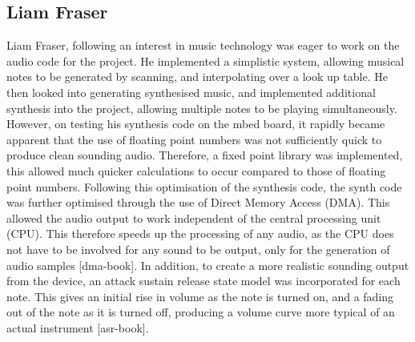 \subsection*{Liam Fraser}
Liam Fraser, following an interest in music technology was eager to work on the 
audio code for the project. He implemented a simplistic system, allowing musical 
notes to be generated by scanning, and interpolating over a look up table. He then 
looked into generating synthesised music, and implemented additional synthesis 
into the project, allowing multiple notes to be playing simultaneously. However, 
on testing his synthesis code on the mbed board, it rapidly became apparent that 
the use of floating point numbers was not sufficiently quick to produce clean 
sounding audio. Therefore, a fixed point library was implemented, this allowed 
much quicker calculations to occur compared to those of floating point numbers. 
Following this optimisation of the synthesis code, the synth code was further 
optimised through the use of Direct Memory Access (DMA). This allowed the audio 
output to work independent of the central processing unit (CPU). This 
therefore speeds up the processing of any audio, as the CPU does not have to be 
involved for any sound to be output, only for the generation of audio samples 
[dma-book]. In addition, to create a more realistic sounding output from the 
device, an attack sustain release state model was incorporated for each note. 
This gives an initial rise in volume as the note is turned on, and a fading out 
of the note as it is turned off, producing a volume curve more typical of an 
actual instrument [asr-book].


